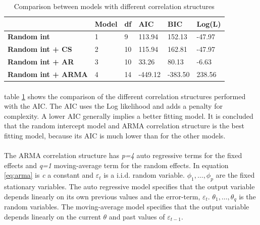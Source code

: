 \documentclass{article}
\begin{document}
\begin{table}[h!]
\centering
\caption{Comparison between models with different correlation structures}
\begin{tabular}{llllll}
\hline
                           & \textbf{Model} & \textbf{df} & \textbf{AIC} & \textbf{BIC} & \textbf{Log(L)} \\
                           \hline
\textbf{Random int}        & 1              & 9           & 113.94       & 152.13       & -47.97          \\
\textbf{Random int + CS}   & 2              & 10          & 115.94       & 162.81       & -47.97          \\
\textbf{Random int + AR}   & 3              & 10          & 33.26        & 80.13        & -6.63           \\
\textbf{Random int + ARMA} & 4              & 14          & -449.12      & -383.50      & 238.56  \\
\hline 
\end{tabular}
\label{tab:corr_structures}
\end{table}

\paragraph{}
table \ref{tab:corr_structures} shows the comparison of the different correlation structures performed with the AIC. The AIC uses the Log likelihood and adds a penalty for complexity. A lower AIC generally implies a better fitting model. It is concluded that the random intercept model and ARMA correlation structure is the best fitting model, because its AIC is much lower than for the other models.

\paragraph{}
The ARMA correlation structure has \textit{p=4} auto regressive terms for the fixed effects and \textit{q=1} moving-average term for the random effects. In equation \ref{eq:arma} is \textit{c} a constant and $\varepsilon_t$ is a i.i.d. random variable. $\phi_1,\ldots, \phi_p$ are the fixed stationary variables. The auto regressive model specifies that the output variable depends linearly on its own previous values and the error-term, $\varepsilon_t$. $\theta_1,\ldots,\theta_q$ is the random variables. The moving-average model specifies that the output variable depends linearly on the current $\theta$ and past values of $\varepsilon_{t-1}$.
\end{document}
